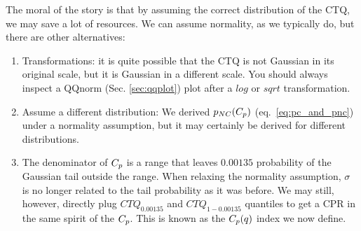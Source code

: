 %
%
%
%
%
%
%
%

The moral of the story is that by assuming the correct distribution of the CTQ, we may save a lot of resources. 
We can assume normality, as we typically do, but there are other alternatives:
\begin{enumerate}
\item Transformations: it is quite possible that the CTQ is not Gaussian in its original scale, but it is Gaussian in a different scale. You should always inspect a QQnorm (Sec. \ref{sec:qqplot}) plot after a $log$ or $sqrt$ transformation.
\item Assume a different distribution: We derived $p_{NC}(C_p)$ (eq.~\ref{eq:pc_and_pnc}) under a normality assumption, but it may certainly be derived for different distributions. 
\item The denominator of $C_p$ is a range that leaves $0.00135$ probability of the Gaussian tail outside the range. 
When relaxing the normality assumption, $\sigma$ is no longer related to the tail probability as it was before. We may still, however, directly plug $CTQ_{0.00135}$ and $CTQ_{1-0.00135}$ quantiles to get a CPR in the same spirit of the $C_p$. This is known as the $C_p(q)$ index we now define.
\end{enumerate}

